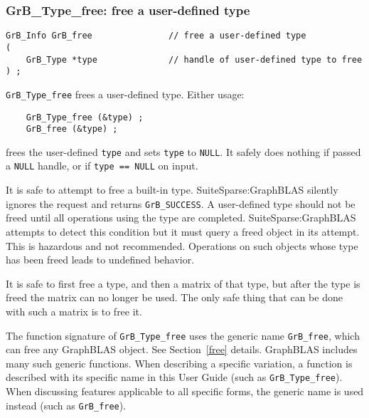 \documentclass[12pt]{article}
\begin{document}
{\newpage
\subsubsection{{\sf GrB\_Type\_free:} free a user-defined type}
\label{type_free}

\begin{mdframed}[userdefinedwidth=6in]
{\footnotesize
\begin{verbatim}
GrB_Info GrB_free               // free a user-defined type
(
    GrB_Type *type              // handle of user-defined type to free
) ;
\end{verbatim}
}\end{mdframed}

\verb'GrB_Type_free' frees a user-defined type.
Either usage:

    {\small
    \begin{verbatim}
    GrB_Type_free (&type) ;
    GrB_free (&type) ; \end{verbatim}}

\noindent
frees the user-defined \verb'type' and
sets \verb'type' to \verb'NULL'.
It safely does nothing if passed a \verb'NULL'
handle, or if \verb'type == NULL' on input.

It is safe to attempt to free a built-in type.  SuiteSparse:GraphBLAS silently
ignores the request and returns \verb'GrB_SUCCESS'.  A user-defined type should
not be freed until all operations using the type are completed.
SuiteSparse:GraphBLAS attempts to detect this condition but it must query a
freed object in its attempt.  This is hazardous and not recommended.
Operations on such objects whose type has been freed leads to undefined
behavior.

It is safe to first free a type, and then a matrix of that type, but after the
type is freed the matrix can no longer be used.  The only safe thing that can
be done with such a matrix is to free it.

The function signature of \verb'GrB_Type_free' uses the generic name
\verb'GrB_free', which can free any GraphBLAS object. See Section~\ref{free}
details.  GraphBLAS includes many such generic functions.  When describing a
specific variation, a function is described with its specific name in this User
Guide (such as \verb'GrB_Type_free').  When discussing features applicable to
all specific forms, the generic name is used instead (such as \verb'GrB_free').

}
\end{document}
